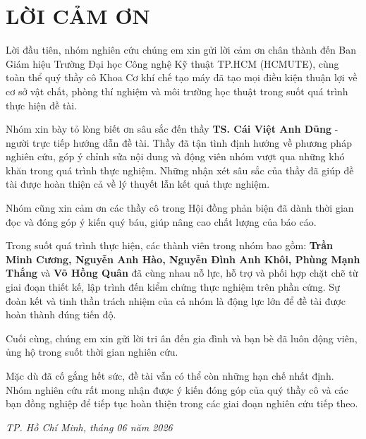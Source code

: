 
\chapter*{LỜI CẢM ƠN}

\begingroup
  \fontsize{13pt}{15.6pt}\selectfont
  \setlength{\parskip}{6pt}
  \setlength{\parindent}{0pt}

  Lời đầu tiên, nhóm nghiên cứu chúng em xin gửi lời cảm ơn chân thành đến Ban Giám hiệu
  Trường Đại học Công nghệ Kỹ thuật TP.HCM (HCMUTE), cùng toàn thể quý thầy cô
  Khoa Cơ khí chế tạo máy đã tạo mọi điều kiện thuận lợi về cơ sở vật chất, phòng
  thí nghiệm và môi trường học thuật trong suốt quá trình thực hiện đề tài.

  Nhóm xin bày tỏ lòng biết ơn sâu sắc đến thầy \textbf{TS. Cái Việt Anh Dũng} -
  người trực tiếp hướng dẫn đề tài. Thầy đã tận tình định hướng về phương pháp
  nghiên cứu, góp ý chỉnh sửa nội dung và động viên nhóm vượt qua những khó khăn
  trong quá trình thực nghiệm. Những nhận xét sâu sắc của thầy đã giúp đề tài
  được hoàn thiện cả về lý thuyết lẫn kết quả thực nghiệm.

  Nhóm cũng xin cảm ơn các thầy cô trong Hội đồng phản biện đã dành thời gian
  đọc và đóng góp ý kiến quý báu, giúp nâng cao chất lượng của báo cáo.

  Trong suốt quá trình thực hiện, các thành viên trong nhóm bao gồm:
  \textbf{Trần Minh Cương, Nguyễn Anh Hào, Nguyễn Đình Anh Khôi, Phùng Mạnh Thắng}
  và \textbf{Võ Hồng Quân} đã cùng nhau nỗ lực, hỗ trợ và phối hợp chặt chẽ
  từ giai đoạn thiết kế, lập trình đến kiểm chứng thực nghiệm trên phần cứng. Sự
  đoàn kết và tinh thần trách nhiệm của cả nhóm là động lực lớn để đề tài được
  hoàn thành đúng tiến độ.

  Cuối cùng, chúng em xin gửi lời tri ân đến gia đình và bạn bè đã luôn động viên,
  ủng hộ trong suốt thời gian nghiên cứu.

  \noindent Mặc dù đã cố gắng hết sức, đề tài vẫn có thể còn những hạn chế nhất
  định. Nhóm nghiên cứu rất mong nhận được ý kiến đóng góp của quý thầy cô và
  các bạn đồng nghiệp để tiếp tục hoàn thiện trong các giai đoạn nghiên cứu
  tiếp theo.

  \vspace{1cm}
  \begin{flushright}
    \textit{TP. Hồ Chí Minh, tháng 06 năm 2026}\\[0.3cm]
  \end{flushright}

\endgroup
